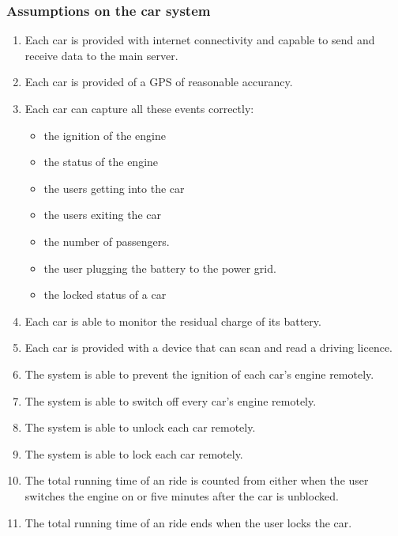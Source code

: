 \documentclass[11pt]{article} %
\begin{document}
\subsubsection{Assumptions on the car system}
\begin{enumerate}
	\item  Each car is provided with internet connectivity and capable to send and receive data to the main server.
	\item  Each car is provided of a GPS of reasonable accurancy.
	\item  Each car can capture all these events correctly:
		\begin{itemize}
			\item the ignition of the engine
			\item the status of the engine
			\item the users getting into the car
			\item the users exiting the car 
			\item the number of passengers.
			\item the user plugging the battery to the power grid.
			\item the locked status of a car
		\end{itemize}
	\item Each car is able to monitor the residual charge of its battery.
	\item Each car is provided with a device that can scan and read a driving licence.
	\item The system is able to prevent the ignition of each car's engine remotely.
	\item The system is able to switch off every car's engine remotely.
	\item The system is able to unlock each car remotely.
	\item The system is able to lock each car remotely.
	\item The total running time of an ride is counted from either when the user switches the engine on or five minutes after the car is unblocked.
	\item The total running time of an ride ends when the user locks the car.
\end{enumerate}
\end{document}
